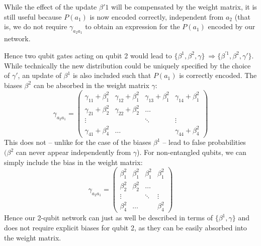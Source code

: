 \documentclass[a4]{article}
\begin{document}
While the effect of the update $\beta{'1}$ will be compensated by the weight
matrix, it is still useful because $P(a_1)$ is now encoded correctly,
independent from $a_2$ (that is, we do not require $\gamma_{a_2a_1}$ to obtain
an expression for the $P(a_1)$ encoded by our network.\par
Hence two qubit gates acting on qubit 2 would lead to
 $\{\beta^1,\beta^2,\gamma\}\:\Rightarrow\{\beta^{'1},\beta^2,\gamma'\}$.
 While technically the new distribution could be uniquely specified by the
 choice of $\gamma'$, an update of $\beta^{1}$ is also included such that
 $P(a_1)$ is correctly encoded. The biases $\beta^2$ can be absorbed in the
 weight matrix $\gamma$:
\begin{equation*}
    \gamma_{a_2a_1} = \begin{pmatrix} \gamma_{11} + \beta^2_1 & \gamma_{12} +
     \beta^2_1 & \gamma_{13}+ \beta^2_1 & \gamma_{14}+ \beta^2_1 \\
    \gamma_{21} + \beta^2_2 &  \gamma_{22} + \beta^2_2 & \hdots & \\
    \vdots & & \ddots & \vdots\\
    \gamma_{41} + \beta^2_4& \hdots & & \gamma_{44} + \beta^2_4\end{pmatrix}
\end{equation*}
This does not -- unlike for the case of the biases $\beta^1$ -- lead to false
 probabilities $(\beta^2$ can never appear independently from $\gamma$). For
 non-entangled qubits, we can simply include the bias in the weight matrix:
\begin{equation*}
    \gamma_{a_2a_1} = \begin{pmatrix}  \beta^2_1 &  \beta^2_1 &  \beta^2_1 &
     \beta^2_1 \\
    \beta^2_2 &  \beta^2_2 & \hdots & \\
    \vdots & & \ddots & \vdots\\
    \beta^2_4& \hdots & & \beta^2_4\end{pmatrix}
\end{equation*}
Hence our 2-qubit network can just as well be described in terms of $\{\beta^1,
 \gamma \}$ and does not require explicit biases for qubit 2, as they can be
 easily absorbed into the weight matrix.
\end{document}

